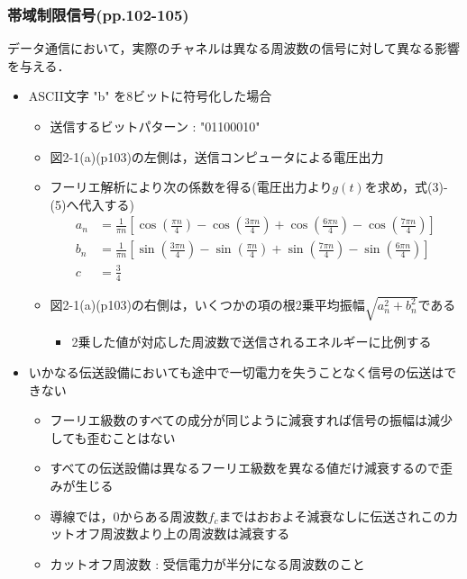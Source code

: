 \documentclass[a4paper]{ltjsarticle}
\begin{document}
		\subsubsection{帯域制限信号(pp.102-105)}
			データ通信において，実際のチャネルは異なる周波数の信号に対して異なる影響を与える．
			\begin{itemize}
				\item ASCII文字 "b" を8ビットに符号化した場合
				\begin{itemize}
					\item 送信するビットパターン : "01100010"
					\item 図2-1(a)(p103)の左側は，送信コンピュータによる電圧出力
					\item フーリエ解析により次の係数を得る(電圧出力より$g(t)$を求め，式(3)-(5)へ代入する)
						\begin{align}
							a_n &= \frac{1}{\pi n}\left[\cos\left(\frac{\pi n}{4}\right) - \cos\left(\frac{3\pi n}{4}\right) + \cos\left( \frac{6\pi n}{4}\right) - \cos\left(\frac{7\pi n}{4} \right) \right] \\
							b_n &= \frac{1}{\pi n}\left[\sin\left(\frac{3\pi n}{4}\right) - \sin\left(\frac{\pi n}{4}\right) + \sin\left( \frac{7\pi n}{4}\right) - \sin\left(\frac{6\pi n}{4} \right) \right] \\
							c &= \frac{3}{4}
						\end{align}
					\item 図2-1(a)(p103)の右側は，いくつかの項の根2乗平均振幅$\sqrt{a^2_n + b^2_n}$である
					\begin{itemize}
						\item 2乗した値が対応した周波数で送信されるエネルギーに比例する
					\end{itemize}
				\end{itemize}
				\item いかなる伝送設備においても途中で一切電力を失うことなく信号の伝送はできない
				\begin{itemize}
					\item フーリエ級数のすべての成分が同じように減衰すれば信号の振幅は減少しても歪むことはない
					\item すべての伝送設備は異なるフーリエ級数を異なる値だけ減衰するので歪みが生じる
					\item 導線では，0からある周波数$f_c$まではおおよそ減衰なしに伝送されこのカットオフ周波数より上の周波数は減衰する
					\item カットオフ周波数 : 受信電力が半分になる周波数のこと
				\end{itemize}

\end{itemize}
\end{document}
